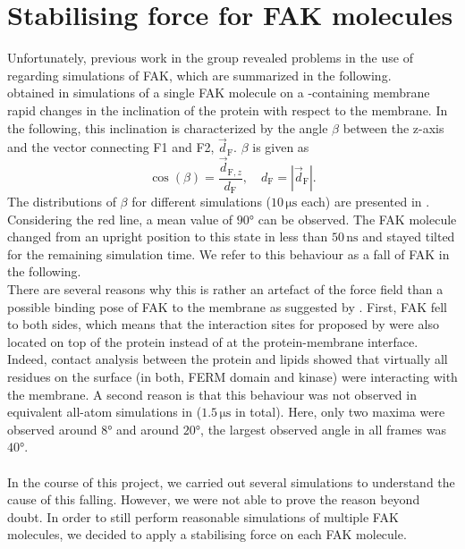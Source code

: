 \section{Stabilising force for FAK molecules}
\label{stabilising}
Unfortunately, previous work in the group \autocite{sara} revealed problems in the use of \martini{} regarding simulations of FAK, which are summarized in the following.\\
\textcite{sara} obtained in simulations of a single FAK molecule on a \pip{}-containing membrane rapid changes in the inclination of the protein with respect to the membrane. In the following, this inclination is characterized by the angle $\beta$ between the z-axis and the vector connecting F1 and F2, $\vec{d}_\text{F}$. $\beta$ is given as
\begin{equation}
\cos\left(\beta\right) = \frac{\vec{d}_{\text{F}, z}}{d_\text{F}},\quad d_\text{F} = \left|\vec{d}_\text{F}\right|.
\end{equation}
The distributions of $\beta$ for different simulations ($10\,\si{\micro\second}$ each) are presented in . Considering the red line, a mean value of $90°$ can be observed. The FAK molecule changed from an upright position to this state in less than $50\,\si{\nano\second}$ and stayed tilted for the remaining simulation time. We refer to this behaviour as a fall of FAK in the following.\\
There are several reasons why this is rather an artefact of the \martini{} force field than a possible binding pose of FAK to the membrane as suggested by \textcite{pap002}. First, FAK fell to both sides, which means that the interaction sites for \pip{} proposed by \textcite{pap002} were also located on top of the protein instead of at the protein-membrane interface. Indeed, contact analysis between the protein and \pip{} lipids showed that virtually all residues on the surface (in both, FERM domain and kinase) were interacting with the membrane. A second reason is that this behaviour was not observed in equivalent all-atom simulations in \charmm{} ($1.5\,\si{\micro\second}$ in total). Here, only two maxima were observed around $8°$ and around $20°$, the largest observed angle in all frames was $40°$.\\
\\
In the course of this project, we carried out several simulations to understand the cause of this falling. However, we were not able to prove the reason beyond doubt. In order to still perform reasonable simulations of multiple FAK molecules, we decided to apply a stabilising force on each FAK molecule.\\
